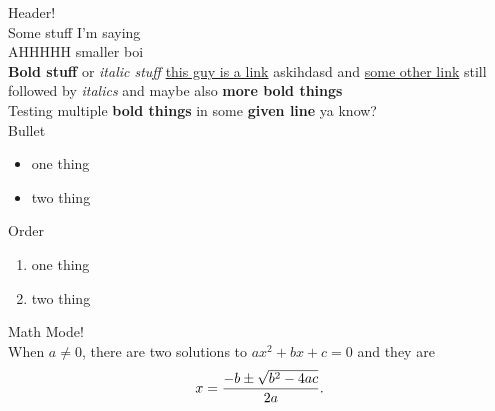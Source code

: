 \documentclass[12pt]{article}
\begin{document}
\raggedright
{\Huge Header!}\\
Some stuff I'm saying\\
{\large AHHHHH smaller boi}\\
\textbf{Bold stuff} or \textit{italic stuff} \href{https://www.colehollant.com}{this guy is a link} askihdasd and \href{https://www.colehollant.com/OOP}{some other link} still followed by \textit{italics} and maybe also \textbf{more bold things}\\
Testing multiple \textbf{bold things} in some \textbf{given line} ya know?\\
{\large Bullet}\\
\begin{itemize} \item one thing\end{itemize}
\begin{itemize} \item two thing\end{itemize}
{\large Order}\\
\begin{enumerate} \setcounter{enumi}{0} \item one thing\end{enumerate}
\begin{enumerate} \setcounter{enumi}{1} \item two thing\end{enumerate}
{\LARGE Math Mode!}\\
When $a \ne 0$, there are two solutions to \(ax^2 + bx + c = 0\) and they are\\
$$x = {-b \pm \sqrt{b^2-4ac} \over 2a}.$$\\
\end{document}
